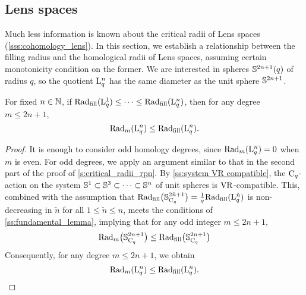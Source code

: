 \subsection{Lens spaces}\label{s:critical_radii_lens}

Much less information is known about the critical radii of Lens spaces (\cref{sss:cohomology_lens}).
In this section, we establish a relationship between the filling radius and the homological radii of Lens spaces, assuming certain monotonicity condition on the former.
We are interested in spheres \(\mathbb{S}^{2n+1}(q)\) of radius \(q\), so the quotient \(\mathrm{L}_q^n\) has the same diameter as the unit sphere \(\mathbb{S}^{2n+1}\). 

\lemma
For fixed $n\in \mathbb{N}$, if $\mathrm{Rad}_{\mathrm{fill}}(\mathrm{L}^1_q) \leq \dotsb \leq \mathrm{Rad}_{\mathrm{fill}}(\mathrm{L}^n_q)$, then for any degree $m\leq 2n+1$,
\[
\mathrm{Rad}_{m}(\mathrm{L}^n_q) \leq \mathrm{Rad}_{\mathrm{fill}}(\mathrm{L}^n_q).
\]

\begin{proof}
    It is enough to consider odd homology degrees, since $\mathrm{Rad}_{m}(\mathrm{L}^n_q) = 0$ when $m$ is even.
    For odd degrees, we apply an argument similar to that in the second part of the proof of \cref{s:critical_radii_rpn}.
    By \cref{ss:system VR compatible}, the $\mathrm{C}_q$-action on the system $\mathbb{S}^1 \subset \mathbb{S}^3 \subset \dotsb \subset \mathbb{S}^n$ of unit spheres is \(\mathrm{VR}\)-compatible.
    This, combined with the assumption that $\mathrm{Rad}_{\mathrm{fill}}\big(\mathbb{S}^{2\tilde{n}+1}_{\mathrm{C}_q}\big) = \tfrac{1}{q} \mathrm{Rad}_{\mathrm{fill}}(\mathrm{L}^{\tilde{n}}_q)$ is non-decreasing in $\tilde{n}$ for all $1\leq \tilde{n} \leq n$, meets the conditions of \cref{ss:fundamental_lemma}, implying that for any odd integer $m \leq 2n+1$,
    \[
    \mathrm{Rad}_m\big(\mathbb{S}^{2n+1}_{\mathrm{C}_q}\big) \leq \mathrm{Rad}_{\mathrm{fill}}\big(\mathbb{S}^{2n+1}_{\mathrm{C}_q}\big)
    \]
    Consequently, for any degree $m \leq 2n+1$, we obtain
    \[
    \mathrm{Rad}_{m}(\mathrm{L}^n_q) \leq \mathrm{Rad}_{\mathrm{fill}}(\mathrm{L}^n_q). \qedhere
    \]
\end{proof}